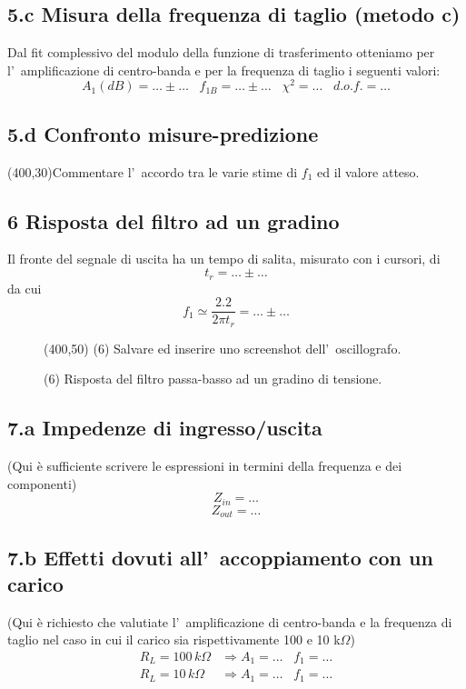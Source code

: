 \documentclass[10pt,a4paper]{article}
\begin{document}
\subsection*{5.c Misura della frequenza di taglio (metodo c)}
Dal fit complessivo del modulo della funzione di trasferimento  
otteniamo per l'~amplificazione di centro-banda e per la frequenza di taglio i seguenti valori:
\[
A_1(dB) = \ldots\pm \ldots \;\;\;f_{1B} = \ldots\pm \ldots\;\;\;\chi^2 = \ldots\;\;\; d.o.f.= \ldots
\]

\subsection*{5.d Confronto misure-predizione}
\vspace{0.5cm}
\framebox(400,30){Commentare l'~accordo tra le varie stime di $f_1$ ed il valore atteso.}

\subsection*{6 Risposta del filtro ad un gradino}
Il fronte del segnale di uscita ha un tempo di salita, misurato con i cursori, di 
\[
t_r = \ldots\pm \ldots
\]
da cui 
\[
f_1 \simeq \frac{2.2}{2\pi t_r} = \ldots\pm \ldots
\]
\begin{figure}[h]
\centering
\framebox(400,50){ (6) Salvare ed inserire uno screenshot dell'~oscillografo.}
\caption{(6) Risposta del filtro passa-basso ad un gradino di tensione.}
\end{figure}

\subsection*{7.a Impedenze di ingresso/uscita}
(Qui \`e sufficiente scrivere le espressioni in termini della frequenza e dei componenti)
\[
Z_{in} = \ldots
\]
\[
Z_{out} = \ldots
\]

\subsection*{7.b Effetti dovuti all'~accoppiamento con un carico}
(Qui \`e richiesto che valutiate l'~amplificazione di centro-banda e la frequenza di taglio nel 
caso in cui il carico sia rispettivamente 100 e 10 k$\Omega$)
\[
\begin{array}{rl}
R_L=100 \,k\Omega & \Rightarrow A_1 = \ldots\;\;\; f_1 = \ldots\\
R_L=10 \,k\Omega & \Rightarrow A_1 = \ldots\;\;\; f_1 = \ldots\\
\end{array}
\]
\end{document}
